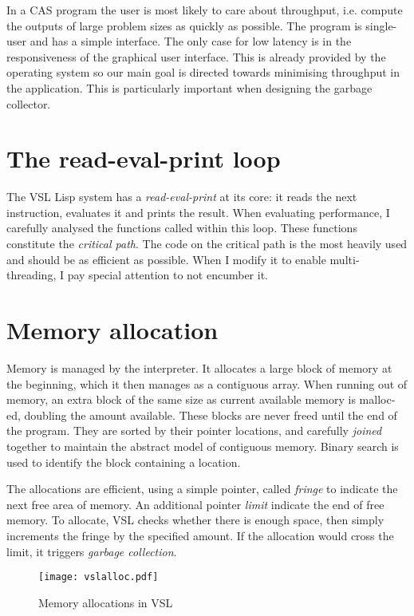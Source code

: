 In a CAS program the user is most likely to care about throughput, i.e. compute the outputs of large
problem sizes as quickly as possible. The program is single-user and has a simple interface. The only case
for low latency is in the responsiveness of the graphical user interface. This is already provided by the
operating system so our main goal is directed towards minimising throughput in the application.
This is particularly important when designing the garbage collector.

\section{The read-eval-print loop}

The VSL Lisp system has a \emph{read-eval-print} at its core: it reads the next instruction, evaluates
it and prints the result. When evaluating performance, I carefully analysed the functions
called within this loop. These functions constitute the \emph{critical path}. The code on the critical
path is the most heavily used and should be as efficient as possible. When I modify it to enable
multi-threading, I pay special attention to not encumber it.

\section{Memory allocation}
Memory is managed by the interpreter. It allocates a large block of memory at the beginning,
which it then manages as a contiguous array. When running out of memory, an extra block of the
same size as current available memory is malloc-ed, doubling the amount available. These blocks are
never freed until the end of the program. They are sorted by their pointer locations,
and carefully \emph{joined} together to maintain the abstract model of contiguous memory. Binary search
is used to identify the block containing a location.

The allocations are efficient, using a simple pointer, called \emph{fringe} to indicate the next
free area of memory. An additional pointer \emph{limit} indicate the end of free memory. To allocate,
VSL checks whether there is enough space, then simply increments the fringe by the specified amount.
If the allocation would cross the limit, it triggers \emph{garbage collection}.

\begin{figure}[H]
    \centering
    \texttt{[image: vslalloc.pdf]}
    \label{fig:vslalloc}
    \caption{Memory allocations in VSL}
\end{figure}

